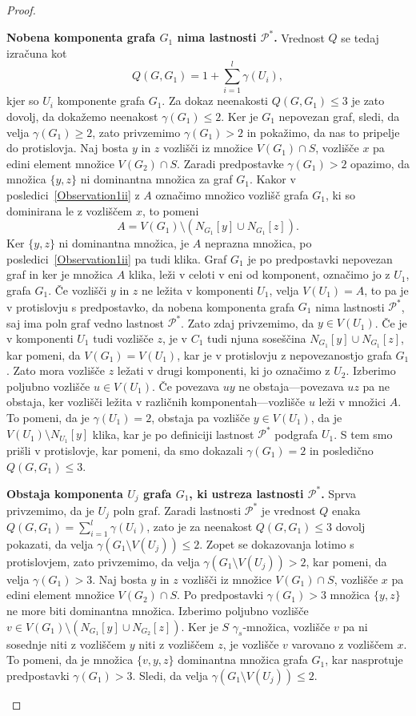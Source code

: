 \documentclass[12pt,a4paper,twoside]{article}
\theoremstyle{definition} %
\theoremstyle{plain} %
\numberwithin{equation}{section}  %
\begin{document}
\begin{proof}
\begin{itemize}
\textbf{Nobena komponenta grafa $G_1$ nima lastnosti $\mathcal{P^*}$.} Vrednost $Q$ se tedaj izračuna kot $$Q(G, G_1) = 1 + \sum\limits_{i=1}^l \gamma(U_i),$$ kjer so $U_i$ komponente grafa $G_1$. Za dokaz neenakosti $Q(G, G_1) \leq 3$ je zato dovolj, da dokažemo neenakost $\gamma(G_1) \leq 2$. Ker je $G_1$ nepovezan graf, sledi, da velja $\gamma(G_1) \geq 2$, zato privzemimo $\gamma(G_1) > 2$ in pokažimo, da nas to pripelje do protislovja. Naj bosta $y$ in $z$ vozlišči iz množice $V(G_1) \cap S$, vozlišče $x$ pa edini element množice  $V(G_2) \cap S$. Zaradi predpostavke $\gamma(G_1) > 2$ opazimo, da množica $\{y, z\}$ ni dominantna množica za graf $G_1$. Kakor v posledici~\ref{Observation1ii} z $A$ označimo množico vozlišč grafa $G_1$, ki so dominirana le z vozliščem $x$, to pomeni $$A = V(G_1) \setminus (N_{G_1}[y] \cup N_{G_1}[z] ).$$ Ker $\{y, z\}$ ni dominantna množica, je $A$ neprazna množica, po posledici~\ref{Observation1ii} pa tudi klika. Graf $G_1$ je po predpostavki nepovezan graf in ker je množica $A$ klika, leži v celoti v eni od komponent, označimo jo z $U_1$, grafa $G_1$. Če vozlišči $y$ in  $z$ ne ležita v komponenti $U_1$, velja $V(U_1) = A$, to pa je v protislovju s predpostavko, da nobena komponenta grafa $G_1$ nima lastnosti $\mathcal{P^*}$, saj ima poln graf vedno lastnost $\mathcal{P^*}$. Zato zdaj privzemimo, da $y \in V(U_1)$. Če je v komponenti $U_1$ tudi vozlišče $z$, je v $C_1$ tudi njuna soseščina $N_{G_1}[y] \cup N_{G_1}[z]$, kar pomeni, da $V(G_1) = V(U_1)$, kar je v protislovju z nepovezanostjo grafa $G_1$. Zato mora vozlišče $z$ ležati v drugi komponenti, ki jo označimo z $U_2$. Izberimo poljubno vozlišče $u \in V(U_1)$. Če povezava $uy$ ne obstaja---povezava $uz$ pa ne obstaja, ker vozlišči ležita v različnih komponentah---vozlišče $u$ leži v množici $A$. To pomeni, da je $\gamma(U_1) = 2$, obstaja pa vozlišče $y \in V(U_1)$, da je $V(U_1) \setminus N_{U_1} [y]$ klika, kar je po definiciji lastnost $\mathcal{P^*}$ podgrafa $U_1$. S tem smo prišli v protislovje, kar pomeni, da smo dokazali $\gamma(G_1) = 2$ in posledično $Q(G, G_1) \leq 3$.

\medskip
\textbf{Obstaja komponenta $U_j$ grafa $G_1$, ki ustreza lastnosti $\mathcal{P^*}$.} Sprva privzemimo, da je $U_j$ poln graf. Zaradi lastnosti $\mathcal{P^*}$ je vrednost $Q$ enaka $Q(G, G_1) = \sum\limits_{i=1}^l \gamma(U_i)$, zato je za neenakost $Q(G, G_1) \leq 3$ dovolj pokazati, da velja $\gamma(G_1 \setminus V(U_j)) \leq 2$. Zopet se dokazovanja lotimo s protislovjem, zato privzemimo, da velja $\gamma(G_1 \setminus V(U_j)) > 2$, kar pomeni, da velja $\gamma(G_1) > 3$. Naj bosta $y$ in $z$ vozlišči iz množice $V(G_1) \cap S$, vozlišče $x$ pa edini element množice  $V(G_2) \cap S$. Po predpostavki $\gamma(G_1) > 3$ množica $\{y, z\}$ ne more biti dominantna množica. Izberimo poljubno vozlišče $v \in V(G_1) \setminus (N_{G_1}[y] \cup N_{G_2}[z])$. Ker je $S$ $\gamma_s$-množica, vozlišče $v$ pa ni sosednje niti z vozliščem $y$ niti z vozliščem $z$, je vozlišče $v$ varovano z vozliščem $x$. To pomeni, da je množica $\{v, y, z\}$ dominantna množica grafa $G_1$, kar nasprotuje predpostavki $\gamma(G_1) > 3$. Sledi, da velja $\gamma(G_1 \setminus V(U_j)) \leq 2$.


\end{itemize}
\end{proof}
\end{document}
